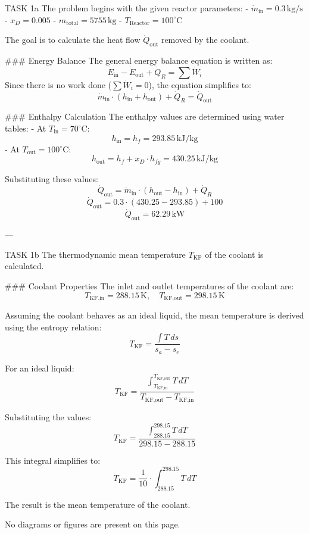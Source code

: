 TASK 1a  
The problem begins with the given reactor parameters:  
- \( \dot{m}_{\text{in}} = 0.3 \, \text{kg/s} \)  
- \( x_D = 0.005 \)  
- \( m_{\text{total}} = 5755 \, \text{kg} \)  
- \( T_{\text{Reactor}} = 100^\circ\text{C} \)  

The goal is to calculate the heat flow \( \dot{Q}_{\text{out}} \) removed by the coolant.  

### Energy Balance  
The general energy balance equation is written as:  
\[
\dot{E}_{\text{in}} - \dot{E}_{\text{out}} + \dot{Q}_R = \sum \dot{W}_i
\]  
Since there is no work done (\( \sum \dot{W}_i = 0 \)), the equation simplifies to:  
\[
\dot{m}_{\text{in}} \cdot (h_{\text{in}} + h_{\text{out}}) + \dot{Q}_R = \dot{Q}_{\text{out}}
\]  

### Enthalpy Calculation  
The enthalpy values are determined using water tables:  
- At \( T_{\text{in}} = 70^\circ\text{C} \):  
  \[
  h_{\text{in}} = h_f = 293.85 \, \text{kJ/kg}
  \]  
- At \( T_{\text{out}} = 100^\circ\text{C} \):  
  \[
  h_{\text{out}} = h_f + x_D \cdot h_{fg} = 430.25 \, \text{kJ/kg}
  \]  

Substituting these values:  
\[
\dot{Q}_{\text{out}} = \dot{m}_{\text{in}} \cdot (h_{\text{out}} - h_{\text{in}}) + \dot{Q}_R
\]  
\[
\dot{Q}_{\text{out}} = 0.3 \cdot (430.25 - 293.85) + 100
\]  
\[
\dot{Q}_{\text{out}} = 62.29 \, \text{kW}
\]  

---

TASK 1b  
The thermodynamic mean temperature \( T_{\text{KF}} \) of the coolant is calculated.  

### Coolant Properties  
The inlet and outlet temperatures of the coolant are:  
\[
T_{\text{KF,in}} = 288.15 \, \text{K}, \quad T_{\text{KF,out}} = 298.15 \, \text{K}
\]  

Assuming the coolant behaves as an ideal liquid, the mean temperature is derived using the entropy relation:  
\[
T_{\text{KF}} = \frac{\int T \, ds}{s_a - s_e}
\]  

For an ideal liquid:  
\[
T_{\text{KF}} = \frac{\int_{T_{\text{KF,in}}}^{T_{\text{KF,out}}} T \, dT}{T_{\text{KF,out}} - T_{\text{KF,in}}}
\]  

Substituting the values:  
\[
T_{\text{KF}} = \frac{\int_{288.15}^{298.15} T \, dT}{298.15 - 288.15}
\]  

This integral simplifies to:  
\[
T_{\text{KF}} = \frac{1}{10} \cdot \int_{288.15}^{298.15} T \, dT
\]  

The result is the mean temperature of the coolant.  

No diagrams or figures are present on this page.
